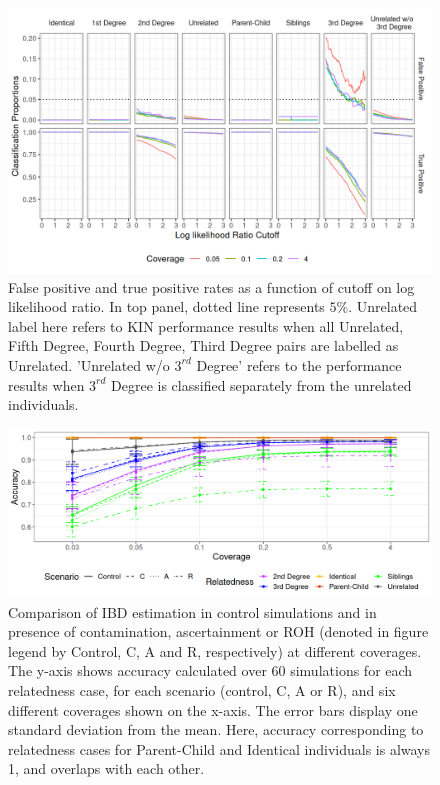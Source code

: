 \documentclass[12pt, letterpaper]{article}
\begin{document}
\begin{figure}[h!]
    \includegraphics[width=16cm]{plots/plotimg/contam0_inbred0_model_performance_allroc_asc0_plot.png}
    \centering
    \caption{False positive and true positive rates as a function of cutoff on log likelihood ratio. In top panel, dotted line represents $5\%$. Unrelated label here refers to KIN performance results when all Unrelated, Fifth Degree, Fourth Degree, Third Degree pairs are labelled as Unrelated. 'Unrelated w/o $3^{rd}$ Degree' refers to the performance results when $3^{rd}$ Degree is classified separately from the unrelated individuals.}
    \label{figS10:cutoff}
\end{figure}

\begin{figure}[h!]
    \centering
    \includegraphics[width=18cm]{plots/plotimg/plot_IBDaccuracy_others_supp.png}
    \caption{Comparison of IBD estimation in control simulations and in presence of contamination, ascertainment or ROH (denoted in figure legend by Control, C, A and R, respectively) at different coverages. The y-axis shows accuracy calculated over 60 simulations for each relatedness case, for each scenario (control, C, A or R), and six different coverages shown on the x-axis. The error bars display one standard deviation from the mean. Here, accuracy corresponding to relatedness cases for Parent-Child and Identical individuals is always 1, and overlaps with each other.}
    \label{figS11:ibd_others}
\end{figure}
\end{document}
